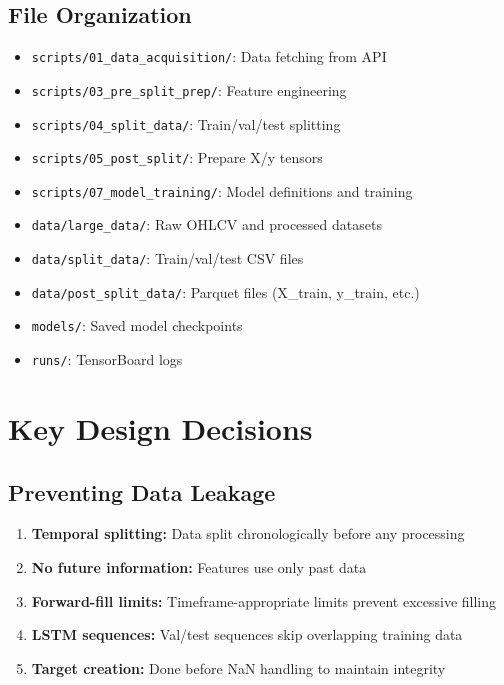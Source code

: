\documentclass[12pt,a4paper]{article}
\begin{document}
\subsection{File Organization}
\begin{itemize}
    \item \texttt{scripts/01\_data\_acquisition/}: Data fetching from API
    \item \texttt{scripts/03\_pre\_split\_prep/}: Feature engineering
    \item \texttt{scripts/04\_split\_data/}: Train/val/test splitting
    \item \texttt{scripts/05\_post\_split/}: Prepare X/y tensors
    \item \texttt{scripts/07\_model\_training/}: Model definitions and training
    \item \texttt{data/large\_data/}: Raw OHLCV and processed datasets
    \item \texttt{data/split\_data/}: Train/val/test CSV files
    \item \texttt{data/post\_split\_data/}: Parquet files (X\_train, y\_train, etc.)
    \item \texttt{models/}: Saved model checkpoints
    \item \texttt{runs/}: TensorBoard logs
\end{itemize}

\section{Key Design Decisions}

\subsection{Preventing Data Leakage}
\begin{enumerate}
    \item \textbf{Temporal splitting:} Data split chronologically before any processing
    \item \textbf{No future information:} Features use only past data
    \item \textbf{Forward-fill limits:} Timeframe-appropriate limits prevent excessive filling
    \item \textbf{LSTM sequences:} Val/test sequences skip overlapping training data
    \item \textbf{Target creation:} Done before NaN handling to maintain integrity
\end{enumerate}
\end{document}
